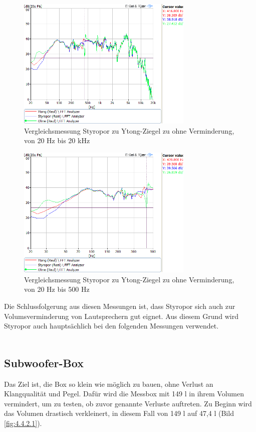 \begin{figure} [H]
	\centering
	\includegraphics[width=0.75\textwidth]{img/Optimierung/Vergleich/VergleichYtognStyroOhne_full.png}
	\caption{Vergleichsmessung Styropor zu Ytong-Ziegel zu ohne Verminderung, von 20 Hz bis 20 kHz}
	\label{fig:4.4.1.5}
\end{figure}\begin{figure} [H]
	\centering
	\includegraphics[width=0.75\textwidth]{img/Optimierung/Vergleich/VergleichYtognStyroOhne_500Hz.png}
	\caption{Vergleichsmessung Styropor zu Ytong-Ziegel zu ohne Verminderung, von 20 Hz bis 500 Hz}
	\label{fig:4.4.1.6}
\end{figure}

Die Schlussfolgerung aus diesen Messungen ist, dass Styropor sich auch zur Volumsverminderung von Lautsprechern gut eignet.
Aus diesem Grund wird Styropor auch hauptsächlich bei den folgenden Messungen verwendet.
\\ \\




\subsection{Subwoofer-Box}\label{subsec:4.4.2}
Das Ziel ist, die Box so klein wie möglich zu bauen, ohne Verlust an Klangqualität und Pegel.
Dafür wird die Messbox mit 149 l in ihrem Volumen vermindert, um zu testen, ob zuvor genannte Verluste auftreten.
Zu Beginn wird das Volumen drastisch verkleinert, in diesem Fall von 149 l auf 47,4 l (Bild \ref{fig:4.4.2.1}).

